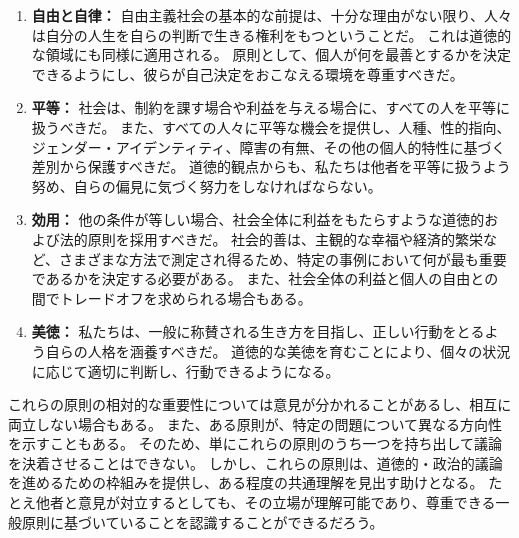 \documentclass[paper=a4,book,openany]{jlreq} \usepackage{mystyle}
\begin{document}
\begin{enumerate}
    \item \textbf{自由と自律：}
    自由主義社会の基本的な前提は、十分な理由がない限り、人々は自分の人生を自らの判断で生きる権利をもつということだ。
これは道徳的な領域にも同様に適用される。
原則として、個人が何を最善とするかを決定できるようにし、彼らが自己決定をおこなえる環境を尊重すべきだ。

    \item \textbf{平等：}
    社会は、制約を課す場合や利益を与える場合に、すべての人を平等に扱うべきだ。
また、すべての人々に平等な機会を提供し、人種、性的指向、ジェンダー・アイデンティティ、障害の有無、その他の個人的特性に基づく差別から保護すべきだ。
道徳的観点からも、私たちは他者を平等に扱うよう努め、自らの偏見に気づく努力をしなければならない。

    \item \textbf{効用：}
    他の条件が等しい場合、社会全体に利益をもたらすような道徳的および法的原則を採用すべきだ。
社会的善は、主観的な幸福や経済的繁栄など、さまざまな方法で測定され得るため、特定の事例において何が最も重要であるかを決定する必要がある。
また、社会全体の利益と個人の自由との間でトレードオフを求められる場合もある。

    \item \textbf{美徳：}
    私たちは、一般に称賛される生き方を目指し、正しい行動をとるよう自らの人格を涵養すべきだ。
道徳的な美徳を育むことにより、個々の状況に応じて適切に判断し、行動できるようになる。

\end{enumerate}

これらの原則の相対的な重要性については意見が分かれることがあるし、相互に両立しない場合もある。
また、ある原則が、特定の問題について異なる方向性を示すこともある。
そのため、単にこれらの原則のうち一つを持ち出して議論を決着させることはできない。
しかし、これらの原則は、道徳的・政治的議論を進めるための枠組みを提供し、ある程度の共通理解を見出す助けとなる。
たとえ他者と意見が対立するとしても、その立場が理解可能であり、尊重できる一般原則に基づいていることを認識することができるだろう。

\end{document}
